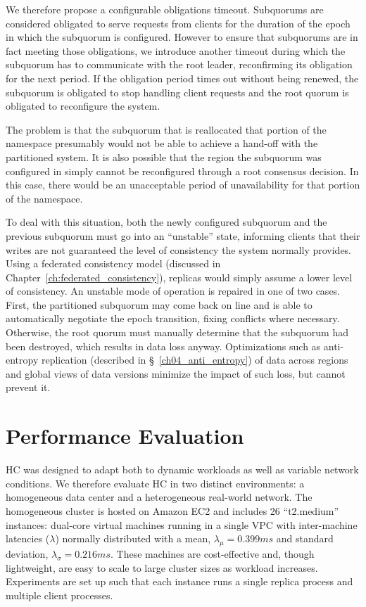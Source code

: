 We therefore propose a configurable obligations timeout.
Subquorums are considered obligated to serve requests from clients for the duration of the epoch in which the subquorum is configured.
However to ensure that subquorums are in fact meeting those obligations, we introduce another timeout during which the subquorum has to communicate with the root leader, reconfirming its obligation for the next period.
If the obligation period times out without being renewed, the subquorum is obligated to stop handling client requests and the root quorum is obligated to reconfigure the system.

The problem is that the subquorum that is reallocated that portion of the namespace presumably would not be able to achieve a hand-off with the partitioned system.
It is also possible that the region the subquorum was configured in simply cannot be reconfigured through a root consensus decision.
In this case, there would be an unacceptable period of unavailability for that portion of the namespace.

To deal with this situation, both the newly configured subquorum and the previous subquorum must go into an ``unstable'' state, informing clients that their writes are not guaranteed the level of consistency the system normally provides.
Using a federated consistency model (discussed in Chapter~\ref{ch:federated_consistency}), replicas would simply assume a lower level of consistency.
An unstable mode of operation is repaired in one of two cases.
First, the partitioned subquorum may come back on line and is able to automatically negotiate the epoch transition, fixing conflicts where necessary.
Otherwise, the root quorum must manually determine that the subquorum had been destroyed, which results in data loss anyway.
Optimizations such as anti-entropy replication (described in \S~\ref{ch04_anti_entropy}) of data across regions and global views of data versions minimize the impact of such loss, but cannot prevent it.

\section{Performance Evaluation}
\label{ch03_evaluation}

HC was designed to adapt both to dynamic workloads as well as variable network conditions.
We therefore evaluate HC in two distinct environments: a homogeneous data center and a heterogeneous real-world network.
The homogeneous cluster is hosted on Amazon EC2 and includes 26 ``t2.medium'' instances: dual-core virtual machines running in a single VPC with inter-machine latencies ($\lambda$) normally distributed with a mean, $\lambda_{\mu}=0.399ms$ and standard deviation, $\lambda_{\sigma}=0.216ms$.
These machines are cost-effective and, though lightweight, are easy to scale to large cluster sizes as workload increases.
Experiments are set up such that each instance runs a single replica process and multiple client processes.

